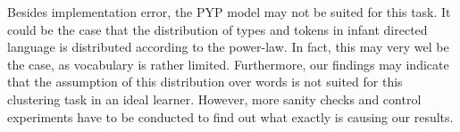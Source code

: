  Besides implementation error, the PYP model may not be suited for this task. It could be the case that the distribution of types and tokens in infant directed language is distributed according to the power-law. In fact, this may very wel be the case, as vocabulary is rather limited. 
 Furthermore, our findings may indicate that the assumption of this distribution over words is not suited for this clustering task in an ideal learner. However, more sanity checks and control experiments have to be conducted to find out what exactly is causing our results.